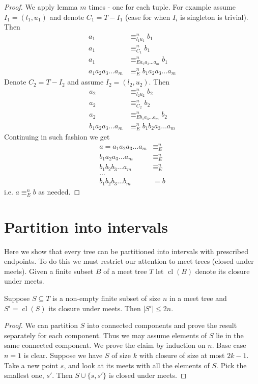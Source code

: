 \documentclass{amsart}
\DeclareMathOperator{\cl}{cl}
\begin{document}
\begin{proof}
	We apply lemma $m$ times - one for each tuple. For example assume $I_1 = (l_1, u_1)$ and denote $C_1 = T - I_1$ (case for when $I_i$ is singleton is trivial). Then
	\begin{align*}
		a_1 &\equiv^n_{l_1u_1} b_1 \\
		a_1 &\equiv^n_{C_1} b_1 \\
		a_1 &\equiv^n_{Ea_2a_3\ldots a_m} b_1 \\
		a_1a_2a_3\ldots a_m &\equiv^n_{E} b_1a_2a_3\ldots a_m
	\end{align*}
	Denote $C_2 = T - I_2$ and assume $I_2 = (l_2, u_2)$. Then
	\begin{align*} 
		a_2 &\equiv^n_{l_2u_2} b_2 \\
		a_2 &\equiv^n_{C_2} b_2 \\
		a_2 &\equiv^n_{Eb_1a_3\ldots a_m} b_2 \\
		b_1a_2a_3\ldots a_m &\equiv^n_{E} b_1b_2a_3\ldots a_m
	\end{align*}
	Continuing in such fashion we get
	\begin{align*}
		a = a_1a_2a_3\ldots a_m &\equiv^n_{E} \\
		    b_1a_2a_3\ldots a_m &\equiv^n_{E} \\
		    b_1b_2b_3\ldots a_m &\equiv^n_{E} \\
				\ldots \\
				b_1b_2b_3\ldots b_m &= b
	\end{align*}
	i.e. $a \equiv^n_{E} b$ as needed.
\end{proof}


\section {Partition into intervals}

Here we show that every tree can be partitioned into intervals with prescribed endpoints. To do this we must restrict our attention to meet trees (closed under meets). Given a finite subset $B$ of a meet tree $T$ let $\cl(B)$ denote its closure under meets.

\begin{Lemma} \label{lm_meet}
	Suppose $S \subseteq T$ is a non-empty finite subset of size $n$ in a meet tree and $S' = \cl(S)$ its closure under meets. Then $|S'| \leq 2n$.
\end{Lemma}
\begin{proof}
	We can partition $S$ into connected components and prove the result separately for each component. Thus we may assume elements of $S$ lie in the same connected component. We prove the claim by induction on $n$. Base case $n = 1$ is clear. Suppose we have $S$ of size $k$ with closure of size at most $2k - 1$. Take a new point $s$, and look at its meets with all the elements of $S$. Pick the smallest one, $s'$. Then $S \cup \{s, s'\}$ is closed under meets.
\end{proof}
\end{document}
